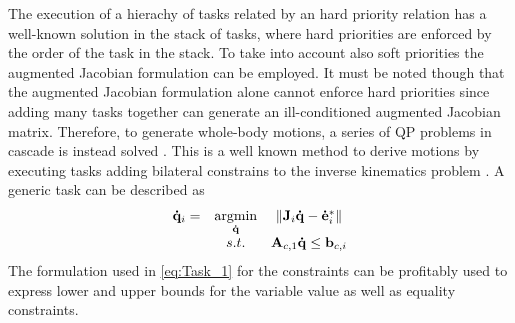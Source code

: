 The execution of a hierachy of tasks related by an hard priority relation has a well-known solution in the stack of tasks, where hard priorities are enforced by the order of the task in the stack. To take into account also soft priorities the augmented Jacobian formulation \cite{chiacchio1991closed} can be employed. It must be noted though that the augmented Jacobian formulation alone cannot enforce hard priorities since adding many tasks together can generate an ill-conditioned augmented Jacobian matrix.
Therefore, to generate whole-body motions, a series of QP problems in cascade is instead solved \cite{kanoun2011kinematic}. This is a well known method to derive motions by executing tasks adding bilateral constrains to the inverse kinematics problem \cite{escande2014hierarchical}.
A generic task can be described as
\begin{equation}
\begin{array}{ccc}
\mathbf{\dot{q}}_i 
   =& \underset{ \mathbf{\dot{q}} }{ \text{argmin} } & \left\| \mathbf{J}_i \mathbf{\dot{q}} - \mathbf{\dot{e}}^*_i \right\|\\
         & {s.t.} & \mathbf{A}_{c,1}\mathbf{\dot{q}} \leq \mathbf{b}_{c,i} 
\end{array}
\label{eq:Task_1}
\end{equation}
The formulation used in \eqref{eq:Task_1} for the constraints can be profitably used to express lower and upper bounds for the variable value as well as equality constraints.

